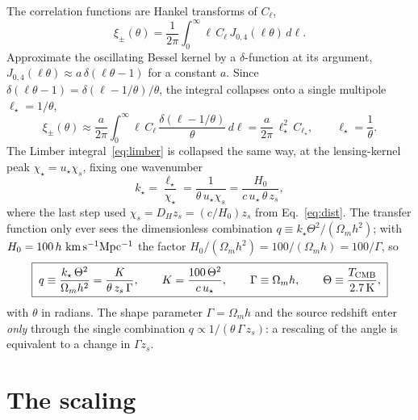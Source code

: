 \documentclass[11pt]{article}
\newcommand{\Om}{\Omega_m}
\newcommand{\Dhub}{D_H}
\newcommand{\xipm}{\xi_\pm}
\begin{document}
The correlation functions are Hankel transforms of $C_\ell$,
\begin{equation}
  \xipm(\theta)=\frac{1}{2\pi}\int_0^\infty \ell\,C_\ell\,
  J_{0,4}(\ell\theta)\,d\ell .
  \label{eq:hankel}
\end{equation}
Approximate the oscillating Bessel kernel by a $\delta$-function at
its argument, $J_{0,4}(\ell\theta)\approx a\,\delta(\ell\theta-1)$
for a constant $a$. Since
$\delta(\ell\theta-1)=\delta(\ell-1/\theta)/\theta$, the integral
collapses onto a single multipole $\ell_\star=1/\theta$,
\begin{equation}
  \xipm(\theta)\approx \frac{a}{2\pi}\int_0^\infty \ell\,C_\ell\,
  \frac{\delta(\ell-1/\theta)}{\theta}\,d\ell
  = \frac{a}{2\pi}\,\ell_\star^2\,C_{\ell_\star},
  \qquad \ell_\star=\frac{1}{\theta}.
  \label{eq:hankel2}
\end{equation}
The Limber integral~\eqref{eq:limber} is collapsed the same way, at
the lensing-kernel peak $\chi_\star=u_\star\chi_s$, fixing one
wavenumber
\begin{equation}
  k_\star=\frac{\ell_\star}{\chi_\star}
        =\frac{1}{\theta\,u_\star\chi_s}
        =\frac{H_0}{c\,u_\star\,\theta\,z_s},
\end{equation}
where the last step used $\chi_s=\Dhub z_s=(c/H_0)z_s$
from Eq.~\eqref{eq:dist}. The transfer function only ever sees the
dimensionless combination $q\equiv k_\star\Theta^2/(\Om h^2)$; with
$H_0=100\,h~{\rm km\,s^{-1}Mpc^{-1}}$ the factor
$H_0/(\Om h^2)=100/(\Om h)=100/\Gamma$, so
\begin{equation}
  \boxed{\;
  q \equiv \frac{k_\star\,\Theta^2}{\Om h^2}
    = \frac{K}{\theta\,z_s\,\Gamma},
  \qquad
  K=\frac{100\,\Theta^2}{c\,u_\star},
  \qquad
  \Gamma\equiv\Om h,
  \qquad
  \Theta\equiv\frac{T_{\rm CMB}}{2.7\,{\rm K}},
  \;}
  \label{eq:q}
\end{equation}
with $\theta$ in radians. The shape parameter $\Gamma=\Om h$ and
the source redshift enter \emph{only} through the single
combination $q\propto 1/(\theta\,\Gamma\,z_s)$: a rescaling of the
angle is equivalent to a change in $\Gamma z_s$.

\section{The scaling}
\end{document}
